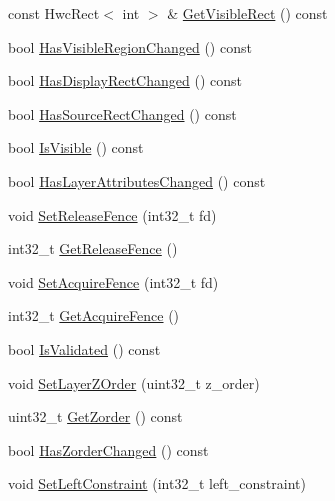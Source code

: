 \begin{DoxyCompactItemize}
\item 
const Hwc\+Rect$<$ int $>$ \& \mbox{\hyperlink{structhwcomposer_1_1HwcLayer_a610c7437c3e292b6b8cc7384891fbfc2}{Get\+Visible\+Rect}} () const
\item 
bool \mbox{\hyperlink{structhwcomposer_1_1HwcLayer_a609fb3677b99ffd99c2ebd0b312ef3c9}{Has\+Visible\+Region\+Changed}} () const
\item 
bool \mbox{\hyperlink{structhwcomposer_1_1HwcLayer_a9d448b96cbef38c1f174f17d43a49c6b}{Has\+Display\+Rect\+Changed}} () const
\item 
bool \mbox{\hyperlink{structhwcomposer_1_1HwcLayer_a2dbe49a6892208c58f09858f6f01a311}{Has\+Source\+Rect\+Changed}} () const
\item 
bool \mbox{\hyperlink{structhwcomposer_1_1HwcLayer_a9c5860d1891bc9bbd1349e03455880e1}{Is\+Visible}} () const
\item 
bool \mbox{\hyperlink{structhwcomposer_1_1HwcLayer_a1721d8448311768aad11378bbc76f659}{Has\+Layer\+Attributes\+Changed}} () const
\item 
void \mbox{\hyperlink{structhwcomposer_1_1HwcLayer_a07742b64885d1461243ee38d2b0dc37a}{Set\+Release\+Fence}} (int32\+\_\+t fd)
\item 
int32\+\_\+t \mbox{\hyperlink{structhwcomposer_1_1HwcLayer_a48545fc3311aa7dd014d697ec461e348}{Get\+Release\+Fence}} ()
\item 
void \mbox{\hyperlink{structhwcomposer_1_1HwcLayer_aaa01965ccb44cf807ec30956651c431a}{Set\+Acquire\+Fence}} (int32\+\_\+t fd)
\item 
int32\+\_\+t \mbox{\hyperlink{structhwcomposer_1_1HwcLayer_add109f8c8a6e9051c10a34ad9535a822}{Get\+Acquire\+Fence}} ()
\item 
bool \mbox{\hyperlink{structhwcomposer_1_1HwcLayer_a57e83759a42bcbc3cc2351ab7239bbc5}{Is\+Validated}} () const
\item 
void \mbox{\hyperlink{structhwcomposer_1_1HwcLayer_af77099fee2df8a72be63df308622f40e}{Set\+Layer\+Z\+Order}} (uint32\+\_\+t z\+\_\+order)
\item 
uint32\+\_\+t \mbox{\hyperlink{structhwcomposer_1_1HwcLayer_a66c6767ed9f3df9daf20ed8439d34eaf}{Get\+Zorder}} () const
\item 
bool \mbox{\hyperlink{structhwcomposer_1_1HwcLayer_a1696a94398a763306db26829088ea45b}{Has\+Zorder\+Changed}} () const
\item 
void \mbox{\hyperlink{structhwcomposer_1_1HwcLayer_aa7d4d6bfadb5492c28d795f5d3197a86}{Set\+Left\+Constraint}} (int32\+\_\+t left\+\_\+constraint)
\item 

\end{DoxyCompactItemize}
